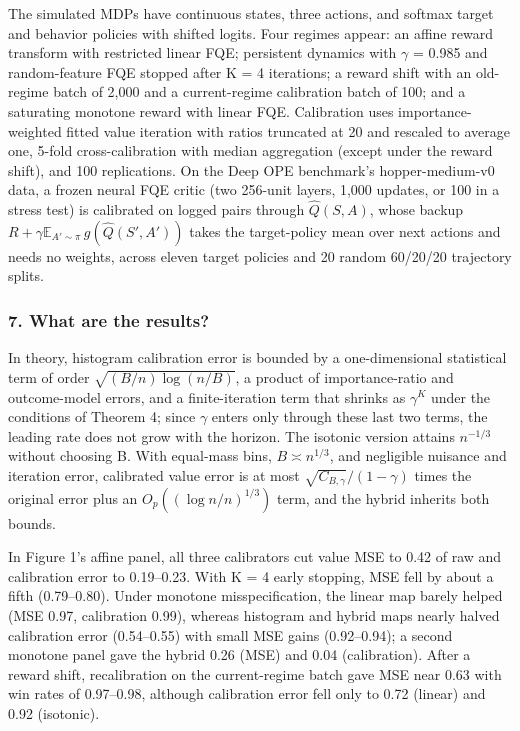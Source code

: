\documentclass[11pt]{article}
\newcommand{\question}[1]{\subsubsection*{#1}}
\begin{document}
The simulated MDPs have continuous states, three actions, and softmax target and behavior policies with shifted logits. Four regimes appear: an affine reward transform with restricted linear FQE; persistent dynamics with \ensuremath{\gamma} = 0.985 and random-feature FQE stopped after K = 4 iterations; a reward shift with an old-regime batch of 2,000 and a current-regime calibration batch of 100; and a saturating monotone reward with linear FQE. Calibration uses importance-weighted fitted value iteration with ratios truncated at 20 and rescaled to average one, 5-fold cross-calibration with median aggregation (except under the reward shift), and 100 replications. On the Deep OPE benchmark's hopper-medium-v0 data, a frozen neural FQE critic (two 256-unit layers, 1,000 updates, or 100 in a stress test) is calibrated on logged pairs through $\hat{Q}(S, A)$, whose backup $R + \gamma \mathbb{E}_{A' \sim \pi}\, g(\hat{Q}(S', A'))$ takes the target-policy mean over next actions and needs no weights, across eleven target policies and 20 random 60/20/20 trajectory splits.

\question{7. What are the results?}

In theory, histogram calibration error is bounded by a one-dimensional statistical term of order $\sqrt{(B/n) \log(n/B)}$, a product of importance-ratio and outcome-model errors, and a finite-iteration term that shrinks as $\gamma^K$ under the conditions of Theorem 4; since \ensuremath{\gamma} enters only through these last two terms, the leading rate does not grow with the horizon. The isotonic version attains $n^{-1/3}$ without choosing B. With equal-mass bins, $B \asymp n^{1/3}$, and negligible nuisance and iteration error, calibrated value error is at most $\sqrt{C_{B,\gamma}}/(1 - \gamma)$ times the original error plus an $O_p((\log n/n)^{1/3})$ term, and the hybrid inherits both bounds.

In Figure 1's affine panel, all three calibrators cut value MSE to 0.42 of raw and calibration error to 0.19--0.23. With K = 4 early stopping, MSE fell by about a fifth (0.79--0.80). Under monotone misspecification, the linear map barely helped (MSE 0.97, calibration 0.99), whereas histogram and hybrid maps nearly halved calibration error (0.54--0.55) with small MSE gains (0.92--0.94); a second monotone panel gave the hybrid 0.26 (MSE) and 0.04 (calibration). After a reward shift, recalibration on the current-regime batch gave MSE near 0.63 with win rates of 0.97--0.98, although calibration error fell only to 0.72 (linear) and 0.92 (isotonic).
\end{document}
